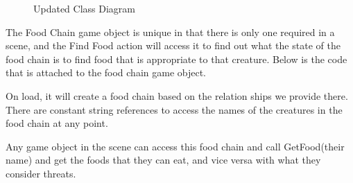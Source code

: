 \documentclass[12pt]{report}
\begin{document}
\begin{figure}[H]
    \centering
    \caption{Updated Class Diagram}
\end{figure}

The Food Chain game object is unique in that there is only one required in a scene, and the Find Food action will access it to find out what the state of the food chain is to find food that is appropriate to that creature. Below is the code that is attached to the food chain game object.

On load, it will create a food chain based on the relation ships we provide there. There are constant string references to access the names of the creatures in the food chain at any point.

Any game object in the scene can access this food chain and call GetFood(their name) and get the foods that they can eat, and vice versa with what they consider threats.
\end{document}
